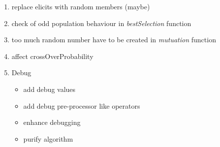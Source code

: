 \documentclass[11]{article}
\begin{document}
\begin{enumerate}
	\item replace elicits with random members (maybe)	
	\item check of odd population behaviour in \textit{bestSelection} function
	\item too much random number have to be created in \textit{mutuation} function	
	\item affect crossOverProbability	
	\item Debug
	\begin{itemize}
		\item add debug values
		\item add debug pre-processor like operators
		\item enhance debugging
		\item purify algorithm
	\end{itemize}
	
\end{enumerate}
\end{document}
